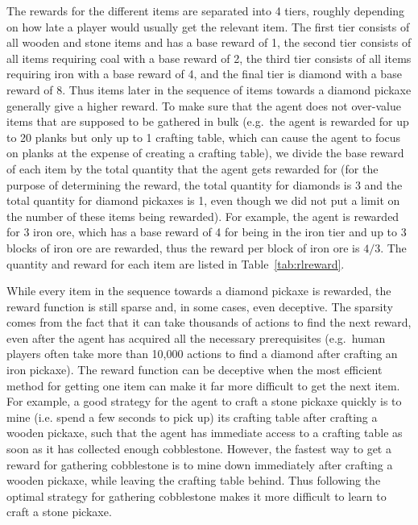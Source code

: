 The rewards for the different items are separated into 4 tiers, roughly depending on how late a player would usually get the relevant item.
The first tier consists of all wooden and stone items and has a base reward of 1, the second tier consists of all items requiring coal with a base reward of 2, the third tier consists of all items requiring iron with a base reward of 4, and the final tier is diamond with a base reward of 8.
Thus items later in the sequence of items towards a diamond pickaxe generally give a higher reward.
To make sure that the agent does not over-value items that are supposed to be gathered in bulk (e.g.\ the agent is rewarded for up to 20 planks but only up to 1 crafting table, which can cause the agent to focus on planks at the expense of creating a crafting table), we divide the base reward of each item by the total quantity that the agent gets rewarded for (for the purpose of determining the reward, the total quantity for diamonds is 3 and the total quantity for diamond pickaxes is 1, even though we did not put a limit on the number of these items being rewarded). For example, the agent is rewarded for 3 iron ore, which has a base reward of 4 for being in the iron tier and up to 3 blocks of iron ore are rewarded, thus the reward per block of iron ore is $4/3$.
The quantity and reward for each item are listed in Table~\ref{tab:rlreward}.

While every item in the sequence towards a diamond pickaxe is rewarded, the reward function is still sparse and, in some cases, even deceptive. The sparsity comes from the fact that it can take thousands of actions to find the next reward, even after the agent has acquired all the necessary prerequisites (e.g.\ human players often take more than 10,000 actions to find a diamond after crafting an iron pickaxe).
The reward function can be deceptive when the most efficient method for getting one item can make it far more difficult to get the next item.
For example, a good strategy for the agent to craft a stone pickaxe quickly is to mine (i.e. spend a few seconds to pick up) its crafting table after crafting a wooden pickaxe, such that the agent has immediate access to a crafting table as soon as it has collected enough cobblestone.
However, the fastest way to get a reward for gathering cobblestone is to mine down immediately after crafting a wooden pickaxe, while leaving the crafting table behind.
Thus following the optimal strategy for gathering cobblestone makes it more difficult to learn to craft a stone pickaxe.

